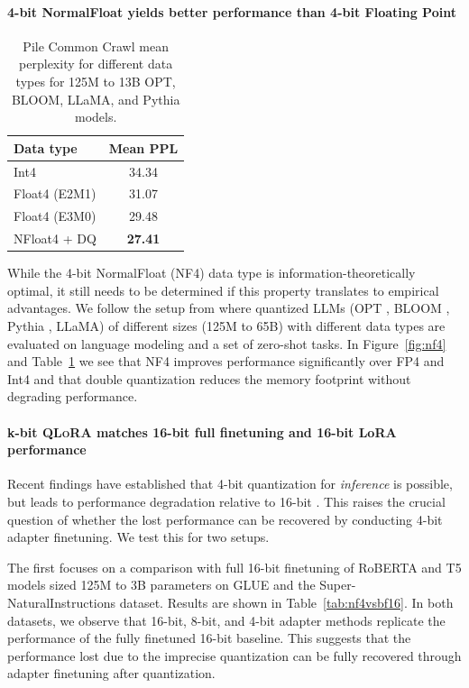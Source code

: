 \paragraph{4-bit NormalFloat yields better performance than 4-bit Floating Point}

\begin{table}
\centering
\caption{Pile Common Crawl mean perplexity for different data types for 125M to 13B OPT, BLOOM, LLaMA, and Pythia models. 
}
\label{tbl:nf4_ppl}
\begin{tabular}{lc}\toprule
Data type & Mean PPL \\\midrule
Int4 & 34.34 \\
Float4 (E2M1) & 31.07 \\
Float4 (E3M0) & 29.48 \\
NFloat4 + DQ & \textbf{27.41}\\\bottomrule
\end{tabular}
\end{table}

While the 4-bit NormalFloat (NF4) data type is information-theoretically optimal, it still needs to be determined if this property translates to empirical advantages. We follow the setup from \citet{dettmers2022case} where quantized LLMs (OPT \citep{zhang2022opt}, BLOOM \cite{scao2022bloom}, Pythia \cite{biderman2023pythia}, LLaMA) of different sizes (125M to 65B) with different data types are evaluated on language modeling and a set of zero-shot tasks. In Figure~\ref{fig:nf4} and Table~\ref{tbl:nf4_ppl} we see that NF4 improves performance significantly over FP4 and Int4 and that double quantization reduces the memory footprint without degrading performance.

\paragraph{k-bit \textsc{QLoRA} matches 16-bit full finetuning and 16-bit LoRA performance} Recent findings have established that 4-bit quantization for \emph{inference} is possible, but leads to performance degradation relative to 16-bit \citep{dettmers2022case,frantar2022gptq}. This raises the crucial question of whether the lost performance can be recovered by conducting 4-bit adapter finetuning. We test this for two setups. 

The first focuses on a comparison with full 16-bit finetuning of RoBERTA and T5 models sized 125M to 3B parameters on GLUE and the Super-NaturalInstructions dataset. Results are shown in Table~\ref{tab:nf4vsbf16}. In both datasets, we observe that 16-bit, 8-bit, and 4-bit adapter methods replicate the performance of the fully finetuned 16-bit baseline. This suggests that the performance lost due to the imprecise quantization can be fully recovered through adapter finetuning after quantization.

